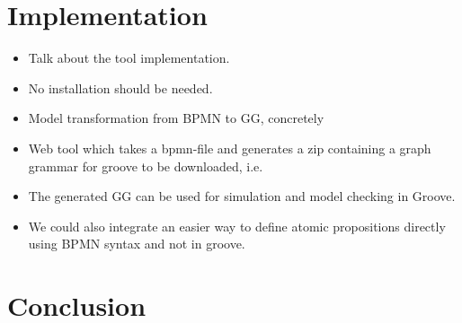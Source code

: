 \documentclass[adraft, copyright, creativecommons]{eptcs} %
\begin{document}
\section{Implementation}
\begin{itemize}
    \item Talk about the tool implementation.
    \item No installation should be needed.
    \item Model transformation from BPMN to GG, concretely
    \item Web tool which takes a bpmn-file and generates a zip containing a graph grammar for groove to be downloaded, i.e.
    \item The generated GG can be used for simulation and model checking in Groove.
    \item We could also integrate an easier way to define atomic propositions directly using BPMN syntax and not in groove.
\end{itemize}

\section{Conclusion}


\end{document}
